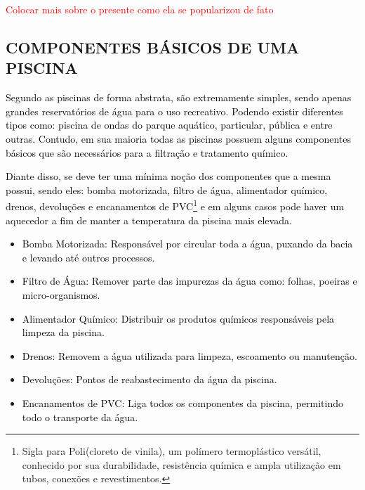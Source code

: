         \textcolor{red}{Colocar mais sobre o presente como ela se popularizou de fato}

    \subsection{COMPONENTES BÁSICOS DE UMA PISCINA}
        
        \textcolor{black}{Segundo \cite{refComponents} as piscinas de forma abstrata, são extremamente simples, sendo apenas grandes reservatórios de água para o uso recreativo. Podendo existir diferentes tipos como: piscina de ondas do parque aquático, particular, pública e entre outras. Contudo, em sua maioria todas as piscinas possuem alguns componentes básicos que são necessários para a filtração e tratamento químico.}

        \textcolor{black}{Diante disso, se deve ter uma mínima noção dos componentes que a mesma possui, sendo eles: bomba motorizada, filtro de água, alimentador químico, drenos, devoluções e encanamentos de PVC\footnote{Sigla para Poli(cloreto de vinila), um polímero termoplástico versátil, conhecido por sua durabilidade, resistência química e ampla utilização em tubos, conexões e revestimentos.} e em alguns casos pode haver um aquecedor a fim de manter a temperatura da piscina mais elevada.}

        \begin{itemize}
        
            \item \textcolor{black}{Bomba Motorizada:}
                \textcolor{black}{Responsável por circular toda a água, puxando da bacia e levando até outros processos.}

            \item \textcolor{black}{Filtro de Água:}
                \textcolor{black}{Remover parte das impurezas da água como: folhas, poeiras e micro-organismos.}

            \item \textcolor{black}{Alimentador Químico:}
                \textcolor{black}{Distribuir os produtos químicos responsáveis pela limpeza da piscina.}

            \item \textcolor{black}{Drenos:}
                \textcolor{black}{Removem a água utilizada para limpeza, escoamento ou manutenção.}

            \item \textcolor{black}{Devoluções:}
                \textcolor{black}{Pontos de reabastecimento da água da piscina.}

            \item \textcolor{black}{Encanamentos de PVC:}
                \textcolor{black}{Liga todos os componentes da piscina, permitindo todo o transporte da água.}
                
        \end{itemize}


